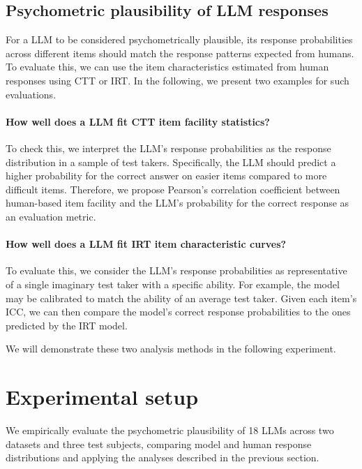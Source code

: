\documentclass[11pt]{article}
\begin{document}
\subsection{Psychometric plausibility of LLM responses}

For a LLM to be considered psychometrically plausible, its response probabilities across different items should match the response patterns expected from humans. To evaluate this, we can use the item characteristics estimated from human responses using CTT or IRT.
In the following, we present two examples for such evaluations.

\paragraph{How well does a LLM fit CTT item facility statistics?}

To check this, we interpret the LLM's response probabilities as the response distribution in a sample of test takers. Specifically, the LLM should predict a higher probability for the correct answer on easier items compared to more difficult items. Therefore, we propose Pearson's correlation coefficient between human-based item facility and the LLM's probability for the correct response as an evaluation metric.

\paragraph{How well does a LLM fit IRT item characteristic curves?}

To evaluate this, we consider the LLM's response probabilities as representative of a single imaginary test taker with a specific ability. For example, the model may be calibrated to match the ability of an average test taker. Given each item's ICC, we can then compare the model's correct response probabilities to the ones predicted by the IRT model.

We will demonstrate these two analysis methods in the following experiment.


\section{Experimental setup}
\label{sec:experiment}

We empirically evaluate the psychometric plausibility of 18 LLMs across two datasets and three test subjects, comparing model and human response distributions and applying the analyses described in the previous section.
\end{document}
